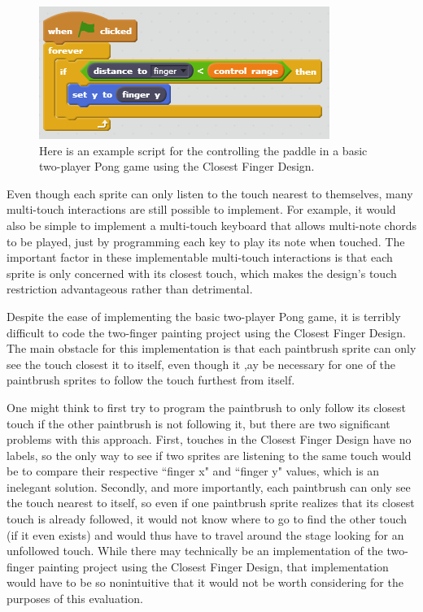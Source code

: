 \begin{figure}
\centering
\includegraphics{images/BasicTwoPlayerPongCFD.PNG}
\caption{Here is an example script for the controlling the paddle in a basic two-player Pong game using the Closest Finger Design.}
\end{figure}

Even though each sprite can only listen to the touch nearest to themselves, many multi-touch interactions are still possible to implement. For example, it would also be simple to implement a multi-touch keyboard that allows multi-note chords to be played, just by programming each key to play its note when touched. The important factor in these implementable multi-touch interactions is that each sprite is only concerned with its closest touch, which makes the design's touch restriction advantageous rather than detrimental.

Despite the ease of implementing the basic two-player Pong game, it is terribly difficult to code the two-finger painting project using the Closest Finger Design. The main obstacle for this implementation is that each paintbrush sprite can only see the touch closest it to itself, even though it ,ay be necessary for one of the paintbrush sprites to follow the touch furthest from itself. 

One might think to first try to program the paintbrush to only follow its closest touch if the other paintbrush is not following it, but there are two significant problems with this approach. First, touches in the Closest Finger Design have no labels, so the only way to see if two sprites are listening to the same touch would be to compare their respective ``finger x" and ``finger y" values, which is an inelegant solution. Secondly, and more importantly, each paintbrush can only see the touch nearest to itself, so even if one paintbrush sprite realizes that its closest touch is already followed, it would not know where to go to find the other touch (if it even exists) and would thus have to travel around the stage looking for an unfollowed touch. While there may technically be an implementation of the two-finger painting project using the Closest Finger Design, that implementation would have to be so nonintuitive that it would not be worth considering for the purposes of this evaluation.

